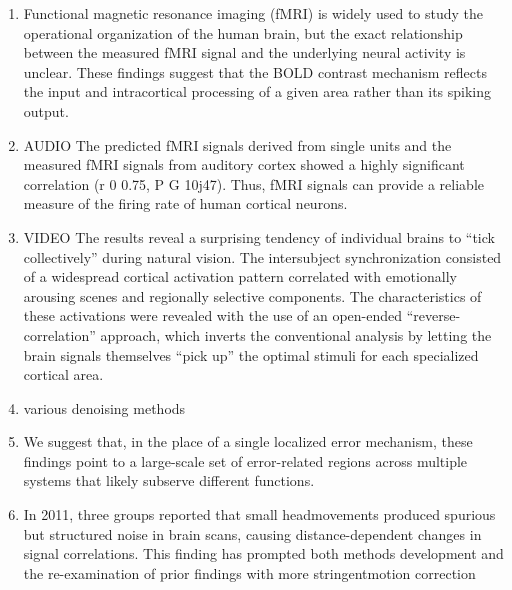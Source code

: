 \documentclass[12pt]{article}
\begin{document}
\begin{enumerate}
\item \cite{Logothetis01} Functional magnetic resonance imaging (fMRI) is widely used to study the operational organization of the human brain, but the exact relationship between the measured fMRI signal and the underlying neural activity is unclear. These findings suggest that the BOLD contrast mechanism reflects the input and intracortical processing of a given area rather than its spiking output.
\item \cite{hasson2005} AUDIO The predicted fMRI signals derived from single units and the measured fMRI signals from auditory cortex showed a highly significant correlation (r 0 0.75, P G 10j47). Thus, fMRI signals can provide a reliable measure of the firing rate of human cortical neurons.
\item \cite{hasson2004} VIDEO The results reveal a surprising tendency of individual brains to “tick collectively” during natural vision. The intersubject synchronization consisted of a widespread cortical activation pattern correlated with emotionally arousing scenes and regionally selective components. The characteristics of these activations were revealed with the use of an open-ended “reverse-correlation” approach, which inverts the conventional analysis by letting the brain signals themselves “pick up” the optimal stimuli for each specialized cortical area.
\item \cite{peterson9} various denoising methods
\item \cite{peterson19} We suggest that, in the place of a single localized error mechanism, these findings point to a large-scale set of error-related regions across multiple systems that likely subserve different functions.
\item \cite{peterson20} In 2011, three groups reported that small headmovements produced spurious but structured noise in brain scans, causing distance-dependent changes in signal correlations. This finding has prompted both methods development and the re-examination of prior findings with more stringentmotion correction
\end{enumerate}
\end{document}
